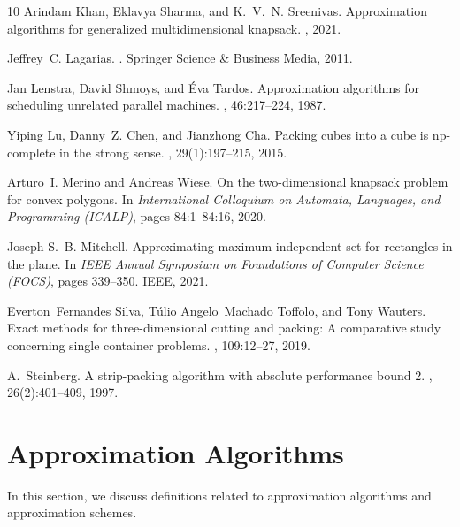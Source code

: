 \begin{thebibliography}{10}
Arindam Khan, Eklavya Sharma, and K.~V.~N. Sreenivas.
\newblock Approximation algorithms for generalized multidimensional knapsack.
, 2021.

Jeffrey~C. Lagarias.
.
\newblock Springer Science \& Business Media, 2011.

Jan Lenstra, David Shmoys, and Éva Tardos.
\newblock Approximation algorithms for scheduling unrelated parallel machines.
, 46:217--224, 1987.

Yiping Lu, Danny~Z. Chen, and Jianzhong Cha.
\newblock Packing cubes into a cube is np-complete in the strong sense.
, 29(1):197--215, 2015.

Arturo~I. Merino and Andreas Wiese.
\newblock On the two-dimensional knapsack problem for convex polygons.
\newblock In {\em International Colloquium on Automata, Languages, and
  Programming (ICALP)}, pages 84:1--84:16, 2020.

Joseph S.~B. Mitchell.
\newblock Approximating maximum independent set for rectangles in the plane.
\newblock In {\em IEEE Annual Symposium on Foundations of Computer Science
  (FOCS)}, pages 339--350. {IEEE}, 2021.

Everton~Fernandes Silva, T{\'u}lio Angelo~Machado Toffolo, and Tony Wauters.
\newblock Exact methods for three-dimensional cutting and packing: A
  comparative study concerning single container problems.
, 109:12--27, 2019.

A.~Steinberg.
\newblock A strip-packing algorithm with absolute performance bound 2.
, 26(2):401--409, 1997.

\end{thebibliography}
\appendix

\section{Approximation Algorithms}
\label{sec:approx}

In this section, we discuss definitions related to approximation algorithms and approximation schemes.

